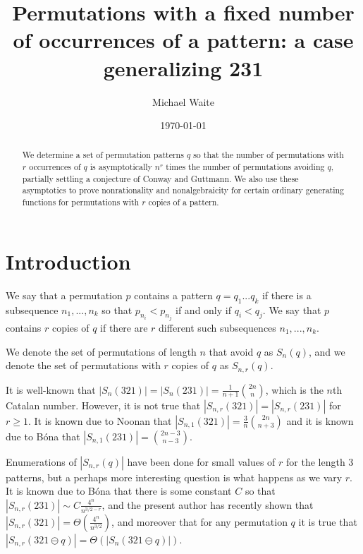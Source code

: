 \documentclass[11pt, final]{amsart}
\date{\today}
\theoremstyle{remark}
\numberwithin{equation}{section}
\begin{document}
\title[Fixed number of occurrences of a pattern]{Permutations with a fixed number of occurrences of a pattern: a case generalizing 231}
\author {Michael Waite}
\address{Department of Mathematics, University of Florida, Gainesville, FL 32601}




\begin{abstract} 
We determine a set of permutation patterns $q$ so that the number of permutations with $r$ occurrences of $q$ is asymptotically $n^r$ times the number of permutations avoiding $q$, partially settling a conjecture of Conway and Guttmann. We also use these asymptotics to prove nonrationality and nonalgebraicity for certain ordinary generating functions for permutations with $r$ copies of a pattern.
\end{abstract}



\maketitle

\section{Introduction}
We say that a permutation $p$ contains a pattern $q = q_1 ... q_k$ if there is a subsequence $n_1, ..., n_k$ so that $p_{n_i} < p_{n_j}$ if and only if $q_i < q_j$. We say that $p$ contains $r$ copies of $q$ if there are $r$ different such subsequences $n_1, ..., n_k$.

We denote the set of permutations of length $n$ that avoid $q$ as $S_n(q)$, and we denote the set of permutations with $r$ copies of $q$ as $S_{n,r}(q)$.



It is well-known that $|S_n(321)| = |S_n(231)|  = \frac{1}{n+1} {2n \choose n}$, which is the $n$th Catalan number. However, it is not true that $|S_{n,r}(321)| = |S_{n,r}(231)|$ for $r\geq 1$. It is known due to Noonan \cite{Noonan} that $|S_{n,1}(321)| = \frac{3}{n} { 2n \choose n+3 }$ and it is known due to Bóna \cite{Bona1998} that $|S_{n,1}(231)| = {2n-3 \choose n-3 } $.

Enumerations of $|S_{n,r}(q)|$ have been done for small values of $r$ for the length $3$ patterns, but a perhaps more interesting question is what happens as we vary $r$. It is known due to Bóna \cite{Bona1997a} that there is some constant $C$ so that $|S_{n,r}(231)| \sim C \frac{4^n} {n^{3/2 - r}}$, and the present author \cite{Waite2025} has recently shown that $|S_{n,r}(321)| = \Theta( \frac{4^n} {n^{3/2}})$, and moreover that for any permutation $q$ it is true that $|S_{n,r}(321 \ominus q)| = \Theta (|S_{n}(321 \ominus q)|)$.
\end{document}
